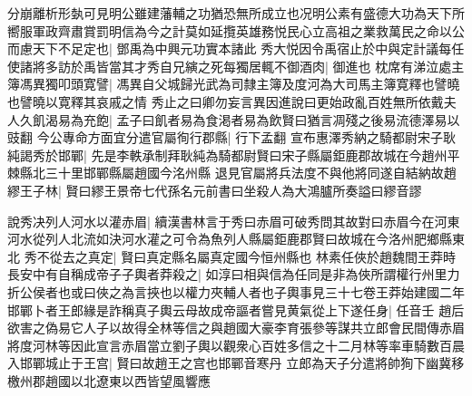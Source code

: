分崩離析形埶可見明公雖建藩輔之功猶恐無所成立也况明公素有盛德大功為天下所嚮服軍政齊肅賞罰明信為今之計莫如延攬英雄務悦民心立高祖之業救萬民之命以公而慮天下不足定也|{
	鄧禹為中興元功實本諸此}
秀大悦因令禹宿止於中與定計議每任使諸將多訪於禹皆當其才秀自兄縯之死每獨居輒不御酒肉|{
	御進也}
枕席有涕泣處主簿馮異獨叩頭寛譬|{
	馮異自父城歸光武為司隸主簿及度河為大司馬主簿寛釋也譬曉也譬曉以寛釋其哀戚之情}
秀止之曰卿勿妄言異因進說曰更始政亂百姓無所依戴夫人久飢渴易為充飽|{
	孟子曰飢者易為食渇者易為飲賢曰猶言凋殘之後易流德澤易以豉翻}
今公專命方面宜分遣官屬徇行郡縣|{
	行下孟翻}
宣布惠澤秀納之騎都尉宋子耿純謁秀於邯鄲|{
	先是李軼承制拜耿純為騎都尉賢曰宋子縣屬鉅鹿郡故城在今趙州平棘縣北三十里邯鄲縣屬趙國今洺州縣}
退見官屬將兵法度不與他將同遂自結納故趙繆王子林|{
	賢曰繆王景帝七代孫名元前書曰坐殺人為大鴻臚所奏謚曰繆音謬}


說秀决列人河水以灌赤眉|{
	續漢書林言于秀曰赤眉可破秀問其故對曰赤眉今在河東河水從列人北流如決河水灌之可令為魚列人縣屬鉅鹿郡賢曰故城在今洛州肥鄉縣東北}
秀不從去之真定|{
	賢曰真定縣名屬真定國今恒州縣也}
林素任俠於趙魏間王莽時長安中有自稱成帝子子輿者莽殺之|{
	如淳曰相與信為任同是非為俠所謂權行州里力折公侯者也或曰俠之為言挾也以權力夾輔人者也子輿事見三十七卷王莽始建國二年}
邯鄲卜者王郎緣是詐稱真子輿云母故成帝謳者嘗見黄氣從上下遂任身|{
	任音壬}
趙后欲害之偽易它人子以故得全林等信之與趙國大豪李育張參等謀共立郎會民間傳赤眉將度河林等因此宣言赤眉當立劉子輿以觀衆心百姓多信之十二月林等率車騎數百晨入邯鄲城止于王宫|{
	賢曰故趙王之宫也邯鄲音寒丹}
立郎為天子分遣將帥狥下幽冀移檄州郡趙國以北遼東以西皆望風響應

